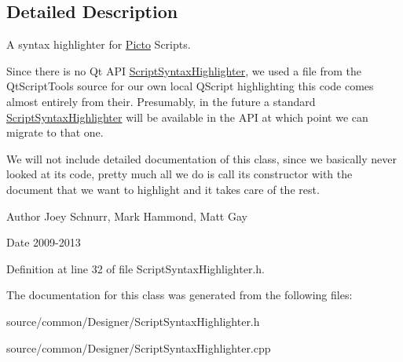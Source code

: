 \subsection{Detailed Description}
A syntax highlighter for \hyperlink{namespace_picto}{Picto} Scripts. 

Since there is no Qt A\-P\-I \hyperlink{class_picto_1_1_script_syntax_highlighter}{Script\-Syntax\-Highlighter}, we used a file from the Qt\-Script\-Tools source for our own local Q\-Script highlighting this code comes almost entirely from their. Presumably, in the future a standard \hyperlink{class_picto_1_1_script_syntax_highlighter}{Script\-Syntax\-Highlighter} will be available in the A\-P\-I at which point we can migrate to that one.

We will not include detailed documentation of this class, since we basically never looked at its code, pretty much all we do is call its constructor with the document that we want to highlight and it takes care of the rest. \begin{DoxyAuthor}{Author}
Joey Schnurr, Mark Hammond, Matt Gay 
\end{DoxyAuthor}
\begin{DoxyDate}{Date}
2009-\/2013 
\end{DoxyDate}


Definition at line 32 of file Script\-Syntax\-Highlighter.\-h.



The documentation for this class was generated from the following files\-:\begin{DoxyCompactItemize}
\item 
source/common/\-Designer/Script\-Syntax\-Highlighter.\-h\item 
source/common/\-Designer/Script\-Syntax\-Highlighter.\-cpp\end{DoxyCompactItemize}
